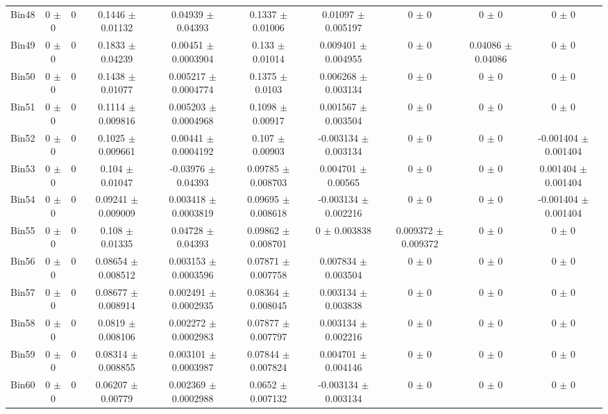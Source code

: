 \begin{tabular}{@{\extracolsep{4pt}}lccccccccc@{}}
     Bin48 & 0 $\pm$ 0 & 0 & 0.1446 $\pm$ 0.01132 & 0.04939 $\pm$ 0.04393 & 0.1337 $\pm$ 0.01006 & 0.01097 $\pm$ 0.005197 & 0 $\pm$ 0 & 0 $\pm$ 0 & 0 $\pm$ 0 \\ 
     Bin49 & 0 $\pm$ 0 & 0 & 0.1833 $\pm$ 0.04239 & 0.00451 $\pm$ 0.0003904 & 0.133 $\pm$ 0.01014 & 0.009401 $\pm$ 0.004955 & 0 $\pm$ 0 & 0.04086 $\pm$ 0.04086 & 0 $\pm$ 0 \\ 
     Bin50 & 0 $\pm$ 0 & 0 & 0.1438 $\pm$ 0.01077 & 0.005217 $\pm$ 0.0004774 & 0.1375 $\pm$ 0.0103 & 0.006268 $\pm$ 0.003134 & 0 $\pm$ 0 & 0 $\pm$ 0 & 0 $\pm$ 0 \\ 
     Bin51 & 0 $\pm$ 0 & 0 & 0.1114 $\pm$ 0.009816 & 0.005203 $\pm$ 0.0004968 & 0.1098 $\pm$ 0.00917 & 0.001567 $\pm$ 0.003504 & 0 $\pm$ 0 & 0 $\pm$ 0 & 0 $\pm$ 0 \\ 
     Bin52 & 0 $\pm$ 0 & 0 & 0.1025 $\pm$ 0.009661 & 0.00441 $\pm$ 0.0004192 & 0.107 $\pm$ 0.00903 & -0.003134 $\pm$ 0.003134 & 0 $\pm$ 0 & 0 $\pm$ 0 & -0.001404 $\pm$ 0.001404 \\ 
     Bin53 & 0 $\pm$ 0 & 0 & 0.104 $\pm$ 0.01047 & -0.03976 $\pm$ 0.04393 & 0.09785 $\pm$ 0.008703 & 0.004701 $\pm$ 0.00565 & 0 $\pm$ 0 & 0 $\pm$ 0 & 0.001404 $\pm$ 0.001404 \\ 
     Bin54 & 0 $\pm$ 0 & 0 & 0.09241 $\pm$ 0.009009 & 0.003418 $\pm$ 0.0003819 & 0.09695 $\pm$ 0.008618 & -0.003134 $\pm$ 0.002216 & 0 $\pm$ 0 & 0 $\pm$ 0 & -0.001404 $\pm$ 0.001404 \\ 
     Bin55 & 0 $\pm$ 0 & 0 & 0.108 $\pm$ 0.01335 & 0.04728 $\pm$ 0.04393 & 0.09862 $\pm$ 0.008701 & 0 $\pm$ 0.003838 & 0.009372 $\pm$ 0.009372 & 0 $\pm$ 0 & 0 $\pm$ 0 \\ 
     Bin56 & 0 $\pm$ 0 & 0 & 0.08654 $\pm$ 0.008512 & 0.003153 $\pm$ 0.0003596 & 0.07871 $\pm$ 0.007758 & 0.007834 $\pm$ 0.003504 & 0 $\pm$ 0 & 0 $\pm$ 0 & 0 $\pm$ 0 \\ 
     Bin57 & 0 $\pm$ 0 & 0 & 0.08677 $\pm$ 0.008914 & 0.002491 $\pm$ 0.0002935 & 0.08364 $\pm$ 0.008045 & 0.003134 $\pm$ 0.003838 & 0 $\pm$ 0 & 0 $\pm$ 0 & 0 $\pm$ 0 \\ 
     Bin58 & 0 $\pm$ 0 & 0 & 0.0819 $\pm$ 0.008106 & 0.002272 $\pm$ 0.0002983 & 0.07877 $\pm$ 0.007797 & 0.003134 $\pm$ 0.002216 & 0 $\pm$ 0 & 0 $\pm$ 0 & 0 $\pm$ 0 \\ 
     Bin59 & 0 $\pm$ 0 & 0 & 0.08314 $\pm$ 0.008855 & 0.003101 $\pm$ 0.0003987 & 0.07844 $\pm$ 0.007824 & 0.004701 $\pm$ 0.004146 & 0 $\pm$ 0 & 0 $\pm$ 0 & 0 $\pm$ 0 \\ 
     Bin60 & 0 $\pm$ 0 & 0 & 0.06207 $\pm$ 0.00779 & 0.002369 $\pm$ 0.0002988 & 0.0652 $\pm$ 0.007132 & -0.003134 $\pm$ 0.003134 & 0 $\pm$ 0 & 0 $\pm$ 0 & 0 $\pm$ 0 \\ 
\hline\hline
  \end{tabular}
